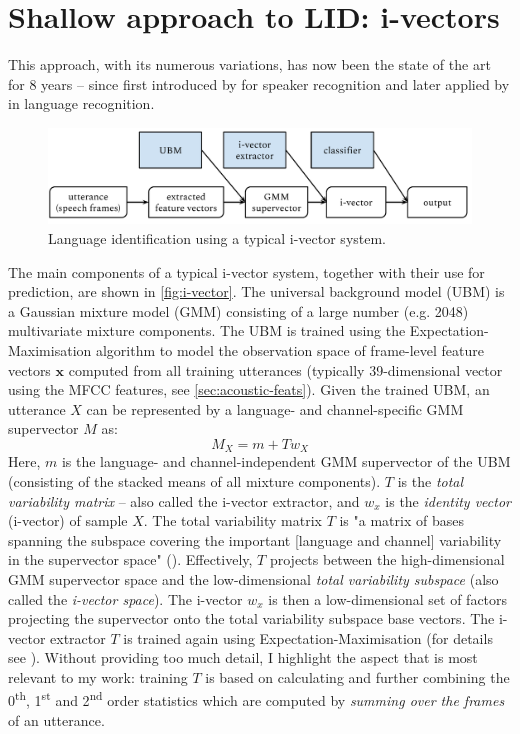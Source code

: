 \documentclass[bsc,frontabs,twoside,singlespacing,parskip,deptreport]{infthesis}
\begin{document}
{  \section{Shallow approach to LID: i-vectors}{
    \label{sec:i-vectors}
    This approach, with its numerous variations, has now been the state of the art for 8 years -- since first introduced by \cite{Dehak_et_al_2011} for speaker recognition and later applied by \cite{Martinez_et_al_2011} in language recognition.
    
    \begin{figure}[h!]
      \centering
      \includegraphics[width=14.5cm]{graphics/i-vectors}
      \vspace*{-1em}
      \caption{Language identification using a typical i-vector system.}
      \label{fig:i-vector}
    \end{figure}

    The main components of a typical i-vector system, together with their use for prediction, are shown in \autoref{fig:i-vector}. The universal background model (UBM) is a Gaussian mixture model (GMM) consisting of a large number (e.g. 2048) multivariate mixture components. The UBM is trained using the Expectation-Maximisation algorithm to model the observation space of frame-level feature vectors $\mathbf{x}$ computed from all training utterances (typically 39-dimensional vector using the MFCC features, see \autoref{sec:acoustic-feats}). Given the trained UBM, an utterance $X$ can be represented by a language- and channel-specific GMM supervector $M$ as:
    \begin{equation}
      \label{eq:supervector}
      M_X = m + Tw_X
    \end{equation}
    Here, $m$ is the language- and channel-independent GMM supervector of the UBM (consisting of the stacked means of all mixture components). $T$ is the \textit{total variability matrix} -- also called the i-vector extractor, and $w_x$ is the \textit{identity vector} (i-vector) of sample $X$. The total variability matrix $T$ is "a matrix of bases spanning the subspace covering the important [language and channel] variability in the supervector space" (\citeauthor[p.862]{Martinez_et_al_2011}). Effectively, $T$ projects between the high-dimensional GMM supervector space and the low-dimensional \textit{total variability subspace} (also called the \textit{i-vector space}). The i-vector $w_x$ is then a low-dimensional set of factors projecting the supervector onto the total variability subspace base vectors. The i-vector extractor $T$ is trained again using Expectation-Maximisation (for details see \citet[p. 100]{ivector_tutorial}). Without providing too much detail, I highlight the aspect that is most relevant to my work: training $T$ is based on calculating and further combining the 0\textsuperscript{th}, 1\textsuperscript{st} and 2\textsuperscript{nd} order statistics which are computed by \textit{summing over the frames} of an utterance.

}}
\end{document}
